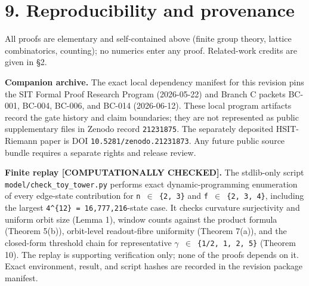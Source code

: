 \documentclass[
  american,
  11pt,
  letterpaper,
]{article}
\newcounter{none} %
\begin{document}
\section{9. Reproducibility and provenance}\label{reproducibility-and-provenance}

All proofs are elementary and self-contained above (finite group theory, lattice combinatorics, counting); no numerics enter any proof. Related-work credits are given in §2.

\textbf{Companion archive.} The exact local dependency manifest for this revision pins the SIT Formal Proof Research Program (2026-05-22) and Branch C packets BC-001, BC-004, BC-006, and BC-014 (2026-06-12). These local program artifacts record the gate history and claim boundaries; they are not represented as public supplementary files in Zenodo record \texttt{21231875}. The separately deposited HSIT-Riemann paper is DOI \nolinkurl{10.5281/zenodo.21231873}. Any future public source bundle requires a separate rights and release review.

\textbf{Finite replay {[}COMPUTATIONALLY CHECKED{]}.} The stdlib-only script \nolinkurl{model/check_toy_tower.py} performs exact dynamic-programming enumeration of every edge-state contribution for \texttt{n\ \ensuremath{\in}\ \{2,\ 3\}} and \texttt{f\ \ensuremath{\in}\ \{2,\ 3,\ 4\}}, including the largest \texttt{4\^{}\{12\}\ =\ 16,777,216}-state case. It checks curvature surjectivity and uniform orbit size (Lemma 1), window counts against the product formula (Theorem 5(b)), orbit-level readout-fibre uniformity (Theorem 7(a)), and the closed-form threshold chain for representative \texttt{\ensuremath{\gamma}\ \ensuremath{\in}\ \{1/2,\ 1,\ 2,\ 5\}} (Theorem 10). The replay is supporting verification only; none of the proofs depends on it. Exact environment, result, and script hashes are recorded in the revision package manifest.
\end{document}
